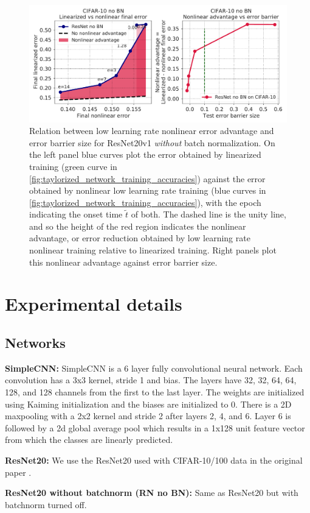 \documentclass{article}
\begin{document}
\begin{figure}[h]
\centering
\includegraphics[width=0.50\linewidth]{figures/nonlinear_advantage_ResNet_noBN_CIFAR10_46859399.pdf}
\caption{Relation between low learning rate nonlinear error advantage and error barrier size for ResNet20v1 \textit{without} batch normalization. On the left panel blue curves plot the error obtained by linearized training (green curve in \cref{fig:taylorized_network_training_accuracies}) against the error obtained by nonlinear low learning rate training (blue curves in \cref{fig:taylorized_network_training_accuracies}), with the epoch indicating the onset time $\tilde t$ of both. The dashed line is the unity line, and so the height of the red region indicates the nonlinear advantage, or error reduction obtained by low learning rate nonlinear training relative to linearized training. Right panels plot this nonlinear advantage against error barrier size.}
\label{fig:nonlinear_advantage_noBN}
\end{figure}


\section{Experimental details}
\label{app:expdetails}
\subsection{Networks}

\textbf{SimpleCNN:} 
SimpleCNN is a 6 layer fully convolutional neural network. 
Each convolution has a 3x3 kernel, stride 1 and bias. 
The layers have 32, 32, 64, 64, 128, and 128 channels from the first to the last layer. 
The weights are initialized using Kaiming initialization \citep{he2015delving} and the biases are initialized to 0.
There is a 2D maxpooling with a 2x2 kernel and stride 2 after layers 2, 4, and 6. 
Layer 6 is followed by a 2d global average pool which results in a 1x128 unit feature vector from which the classes are linearly predicted.

\textbf{ResNet20:}
We use the ResNet20 used with CIFAR-10/100 data in the original paper \citep{he2015deep}.

\textbf{ResNet20 without batchnorm (RN no BN):}
Same as ResNet20 but with batchnorm turned off.
\end{document}
